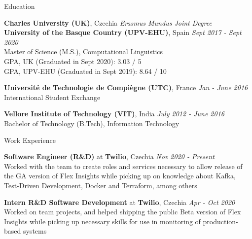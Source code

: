\documentclass{resume}
\begin{document}



\begin{rSection}{Education}

    {\bf Charles University (UK)}, Czechia \hfill 
        {\em Erasmus Mundus Joint Degree}\\
    {\bf University of the Basque Country (UPV-EHU)}, Spain \hfill 
        {\em Sept 2017 - Sept 2020}\\
            Master of Science (M.S.), Computational Linguistics\\
            GPA, UK (Graduated in Sept 2020): 3.03 / 5\\
            GPA, UPV-EHU (Graduated in Sept 2019): 8.64 / 10
    
    {\bf Universit\'e de Technologie de Compi\`egne (UTC)}, France \hfill
        {\em Jan - June 2016}\\
            International Student Exchange
            
    {\bf Vellore Institute of Technology (VIT)}, India \hfill
        {\em July 2012 - June 2016}\\
            Bachelor of Technology (B.Tech), Information Technology
    
\end{rSection}


\begin{rSection}{Work Experience}

    {\textbf{Software Engineer (R\&D)} at \textbf{Twilio}, Czechia} \hfill {\em Nov 2020 - Present}\\
    Worked with the team to create roles and services necessary to allow release of the GA version of Flex Insights while picking up on knowledge about Kafka, Test-Driven Development, Docker and Terraform, among others
            
    {\textbf{Intern R\&D Software Development} at \textbf{Twilio}, Czechia}
        \hfill {\em Apr - Oct 2020}\\
    Worked on team projects, and helped shipping the public Beta version of Flex Insights while picking up necessary skills for use in monitoring of production-based systems

\end{rSection}
\end{document}
